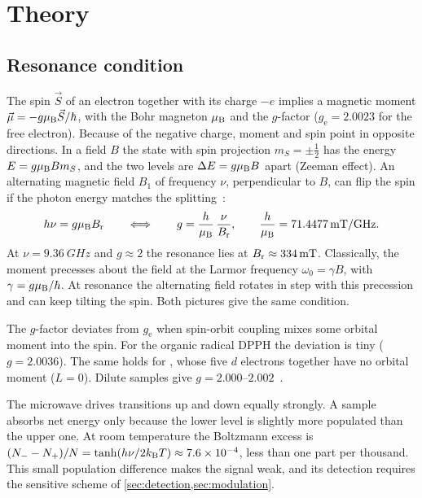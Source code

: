 \section{Theory}\label{sec:theory}

\subsection{Resonance condition}\label{sec:resonance}

The spin $\vec S$ of an electron together with its charge $-e$ implies a magnetic moment $\vec\mu=-g\mu_\mathrm{B}\vec S/\hbar$,
with the Bohr magneton
$\mu_\mathrm{B}$ and the $g$-factor ($g_\mathrm e=\num{2.0023}$ for the free electron). Because of the negative charge, moment
and spin point in opposite directions. In a field $B$ the state with spin projection
$m_S=\pm\frac12$ has the energy $E=g\mu_\mathrm{B} Bm_S$, and the two levels are $\Delta E=g\mu_\mathrm{B} B$ apart (Zeeman effect).
An alternating magnetic field $B_1$ of frequency $\nu$, perpendicular to $B$, can flip the spin if the photon energy
matches the splitting~\cite{weil2007,slichter1990}:
\begin{equation}\label{eq:resonance}
  h\nu=g\mu_\mathrm{B}B_\mathrm{r}
  \qquad\Longleftrightarrow\qquad
  g=\frac{h}{\mu_\mathrm{B}}\,\frac{\nu}{B_\mathrm{r}},\qquad \frac{h}{\mu_\mathrm{B}}=\qty{71.4477}{mT/GHz}.
\end{equation}
At $\nu=\qty{9.36}{GHz}$ and $g\approx2$ the resonance lies at $B_\mathrm{r}\approx\qty{334}{mT}$. Classically,
the moment precesses about the field at the Larmor frequency $\omega_0=\gamma B$, with $\gamma=g\mu_\mathrm{B}/\hbar$. At resonance
the alternating field rotates in step with this precession and can keep tilting the spin. Both pictures
give the same condition.

The $g$-factor deviates from $g_\mathrm e$ when spin-orbit coupling mixes some orbital moment into the spin. For the
organic radical DPPH the deviation is tiny ($g=\num{2.0036}$). The same holds for , whose five $d$ electrons
together have no orbital moment ($L=0$). Dilute samples give $g=\numrange{2.000}{2.002}$~\cite{abragam1970}.

The microwave drives transitions up and down equally strongly. A sample absorbs net energy only because the lower
level is slightly more populated than the upper one. At room temperature the Boltzmann excess is
$(N_--N_+)/N=\tanh(h\nu/2k_\mathrm{B} T)\approx\num{7.6e-4}$, less than one part per thousand. This small population difference makes the signal weak, and its detection requires
the sensitive scheme of \cref{sec:detection,sec:modulation}.

